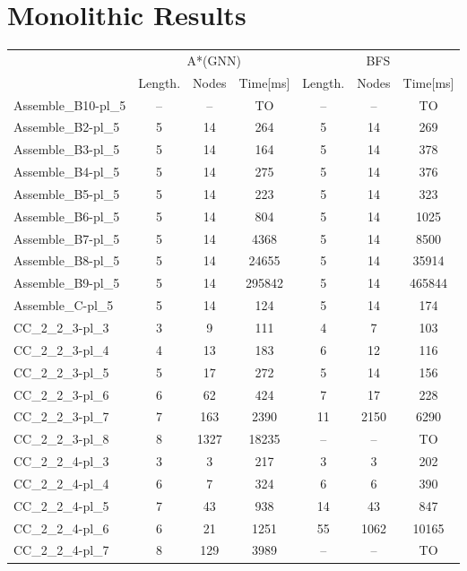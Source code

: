 \documentclass{article}
\newcommand{\BFSres}{BFS}
\newcommand{\GNNres}{A*(GNN)}
\newcommand{\planLength}{Length.}
\newcommand{\nodesExp}{Nodes}
\newcommand{\solvingTime}{Time}
\newcommand{\unsolvedColumn}{--}
\newcommand{\myTO}{TO}
\begin{document}
\section*{Monolithic Results}
\begin{longtable}[!ht]{l|ccc|ccc}
\centering
\multirow2{*}{\textbf{Instance Name}} & \multicolumn{3}{c|}{\GNNres} & \multicolumn{3}{c}{\BFSres} \\
\cline{2-7}
& \planLength & \nodesExp & \solvingTime [ms] & \planLength & \nodesExp & \solvingTime [ms] \\
\hline
Assemble\_B10-pl\_5 & \unsolvedColumn & \unsolvedColumn & \myTO & \unsolvedColumn & \unsolvedColumn & \myTO \\
Assemble\_B2-pl\_5 & 5 & 14 & 264 & 5 & 14 & 269 \\
Assemble\_B3-pl\_5 & 5 & 14 & 164 & 5 & 14 & 378 \\
Assemble\_B4-pl\_5 & 5 & 14 & 275 & 5 & 14 & 376 \\
Assemble\_B5-pl\_5 & 5 & 14 & 223 & 5 & 14 & 323 \\
Assemble\_B6-pl\_5 & 5 & 14 & 804 & 5 & 14 & 1025 \\
Assemble\_B7-pl\_5 & 5 & 14 & 4368 & 5 & 14 & 8500 \\
Assemble\_B8-pl\_5 & 5 & 14 & 24655 & 5 & 14 & 35914 \\
Assemble\_B9-pl\_5 & 5 & 14 & 295842 & 5 & 14 & 465844 \\
Assemble\_C-pl\_5 & 5 & 14 & 124 & 5 & 14 & 174 \\
CC\_2\_2\_3-pl\_3 & 3 & 9 & 111 & 4 & 7 & 103 \\
CC\_2\_2\_3-pl\_4 & 4 & 13 & 183 & 6 & 12 & 116 \\
CC\_2\_2\_3-pl\_5 & 5 & 17 & 272 & 5 & 14 & 156 \\
CC\_2\_2\_3-pl\_6 & 6 & 62 & 424 & 7 & 17 & 228 \\
CC\_2\_2\_3-pl\_7 & 7 & 163 & 2390 & 11 & 2150 & 6290 \\
CC\_2\_2\_3-pl\_8 & 8 & 1327 & 18235 & \unsolvedColumn & \unsolvedColumn & \myTO \\
CC\_2\_2\_4-pl\_3 & 3 & 3 & 217 & 3 & 3 & 202 \\
CC\_2\_2\_4-pl\_4 & 6 & 7 & 324 & 6 & 6 & 390 \\
CC\_2\_2\_4-pl\_5 & 7 & 43 & 938 & 14 & 43 & 847 \\
CC\_2\_2\_4-pl\_6 & 6 & 21 & 1251 & 55 & 1062 & 10165 \\
CC\_2\_2\_4-pl\_7 & 8 & 129 & 3989 & \unsolvedColumn & \unsolvedColumn & \myTO \\

\end{longtable}
\end{document}
